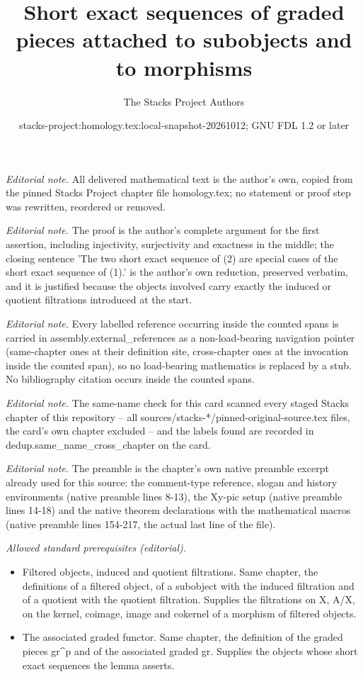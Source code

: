 \documentclass[10pt,a4paper]{amsart}
\title{Short exact sequences of graded pieces attached to subobjects and to morphisms}
\author{The Stacks Project Authors}
\date{stacks-project:homology.tex:local-snapshot-20261012; GNU FDL 1.2 or later}
\theoremstyle{plain}
\theoremstyle{definition}
\theoremstyle{remark}
\numberwithin{equation}{subsection}
\begin{document}
\maketitle
\noindent\textit{Editorial note.} All delivered mathematical text is the author's own, copied from the pinned Stacks Project chapter file homology.tex; no statement or proof step was rewritten, reordered or removed.\par\medskip
\noindent\textit{Editorial note.} The proof is the author's complete argument for the first assertion, including injectivity, surjectivity and exactness in the middle; the closing sentence 'The two short exact sequence of (2) are special cases of the short exact sequence of (1).' is the author's own reduction, preserved verbatim, and it is justified because the objects involved carry exactly the induced or quotient filtrations introduced at the start.\par\medskip
\noindent\textit{Editorial note.} Every labelled reference occurring inside the counted spans is carried in assembly.external\_references as a non-load-bearing navigation pointer (same-chapter ones at their definition site, cross-chapter ones at the invocation inside the counted span), so no load-bearing mathematics is replaced by a stub. No bibliography citation occurs inside the counted spans.\par\medskip
\noindent\textit{Editorial note.} The same-name check for this card scanned every staged Stacks chapter of this repository -- all sources/stacks-*/pinned-original-source.tex files, the card's own chapter excluded -- and the labels found are recorded in dedup.same\_name\_cross\_chapter on the card.\par\medskip
\noindent\textit{Editorial note.} The preamble is the chapter's own native preamble excerpt already used for this source: the comment-type reference, slogan and history environments (native preamble lines 8-13), the Xy-pic setup (native preamble lines 14-18) and the native theorem declarations with the mathematical macros (native preamble lines 154-217, the actual last line of the file).\par\medskip
\noindent\textit{Allowed standard prerequisites (editorial).}\begin{itemize}
\item Filtered objects, induced and quotient filtrations. Same chapter, the definitions of a filtered object, of a subobject with the induced filtration and of a quotient with the quotient filtration. Supplies the filtrations on X, A/X, on the kernel, coimage, image and cokernel of a morphism of filtered objects.
\item The associated graded functor. Same chapter, the definition of the graded pieces gr\textasciicircum{}p and of the associated graded gr. Supplies the objects whose short exact sequences the lemma asserts.
\end{itemize}\medskip
\end{document}
